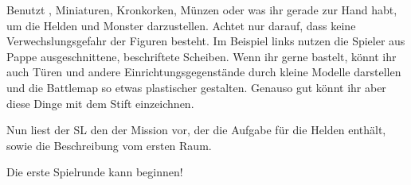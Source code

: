 {	\bigskip

	\noindent
	Benutzt , Miniaturen, Kronkorken, Münzen oder was ihr gerade zur Hand habt, um die Helden und Monster darzustellen. Achtet nur darauf, dass keine Verwechslungsgefahr der Figuren besteht. Im Beispiel links nutzen die Spieler aus Pappe ausgeschnittene, beschriftete Scheiben. Wenn ihr gerne bastelt, könnt ihr auch Türen und andere Einrichtungsgegenstände durch kleine Modelle darstellen und die Battlemap so etwas plastischer gestalten. Genauso gut könnt ihr aber diese Dinge mit dem Stift einzeichnen.

	\bigskip

	\noindent
	Nun liest der SL den  der Mission vor, der die Aufgabe für die Helden enthält, sowie die Beschreibung vom ersten Raum.

	\bigskip

	\noindent
	Die erste Spielrunde kann beginnen!
}

